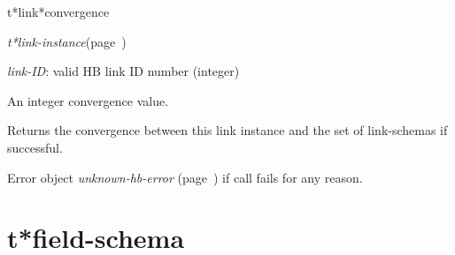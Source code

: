 \begin{description}
\item [Name:]  t*link*convergence

\item [Class:] {\sl t*link-instance}\hfill(page~\pageref{t*link-instance})

\item [Parameters:]
\item {\sl link-ID}:  
valid HB link ID number (integer)



\item [Return-value:]

An integer convergence value.

\item [Description:]

Returns the convergence between this link instance and
the set of link-schemas if successful.

Error object {\sl unknown-hb-error} (page~\pageref{unknown-hb-error}) if call fails for
any reason.

\item [Public:]



\end{description}
\horizontalline

\section{t*field-schema}
\label{t*field-schema}

